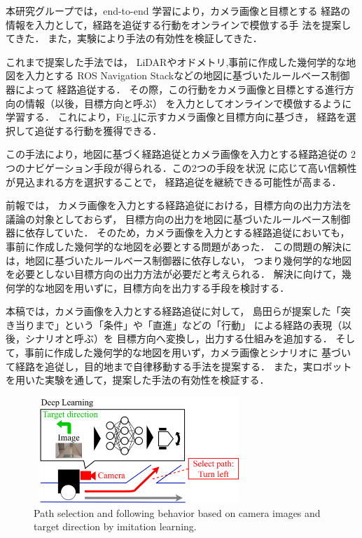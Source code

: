 \documentclass{sice-si}
\begin{document}
本研究グループでは，end-to-end 学習により，カメラ画像と目標とする
経路の情報を入力として，経路を追従する行動をオンラインで模倣する手
法を提案してきた\cite{haruyama2022}\cite{fujiwara2023}．
また，実験により手法の有効性を検証してきた．
\par
これまで提案した手法では，
LiDARやオドメトリ,事前に作成した幾何学的な地図を入力とする
ROS Navigation Stack\cite{ros-navigation}などの地図に基づいたルールベース制御器によって
経路追従する．
その際，この行動をカメラ画像と目標とする進行方向の情報（以後，目標方向と呼ぶ）
を入力としてオンラインで模倣するように学習する．
これにより，Fig.\ref{fig:camera_base}に示すカメラ画像と目標方向に基づき，
経路を選択して追従する行動を獲得できる．
\par
この手法により，地図に基づく経路追従とカメラ画像を入力とする経路追従の
2つのナビゲーション手段が得られる．この2つの手段を状況
に応じて高い信頼性が見込まれる方を選択することで，
経路追従を継続できる可能性が高まる．
\par
前報では\cite{haruyama2022}\cite{fujiwara2023}，
カメラ画像を入力とする経路追従における，目標方向の出力方法を議論の対象としておらず，
目標方向の出力を地図に基づいたルールベース制御器に依存していた．
そのため，カメラ画像を入力とする経路追従においても，
事前に作成した幾何学的な地図を必要とする問題があった．
この問題の解決には，地図に基づいたルールベース制御器に依存しない，
つまり幾何学的な地図を必要としない目標方向の出力方法が必要だと考えられる．
解決に向けて，幾何学的な地図を用いずに，目標方向を出力する手段を検討する．
\par
本稿では，カメラ画像を入力とする経路追従に対して，
島田らが提案した「突き当りまで」という「条件」や「直進」などの「行動」
による経路の表現（以後，シナリオと呼ぶ）\cite{shimada2020}を
目標方向へ変換し，出力する仕組みを追加する．
そして，事前に作成した幾何学的な地図を用いず，カメラ画像とシナリオに
基づいて経路を追従し，目的地まで自律移動する手法を提案する．
また，実ロボットを用いた実験を通して，提案した手法の有効性を検証する．
\begin{figure}[h!]
    \centering
     \includegraphics[height=40mm,width=80mm]{./figs/camera_base.png}
     \caption{Path selection and following behavior based on camera images and
     target direction by imitation learning.}\label{fig:camera_base}
\end{figure}
\end{document}
